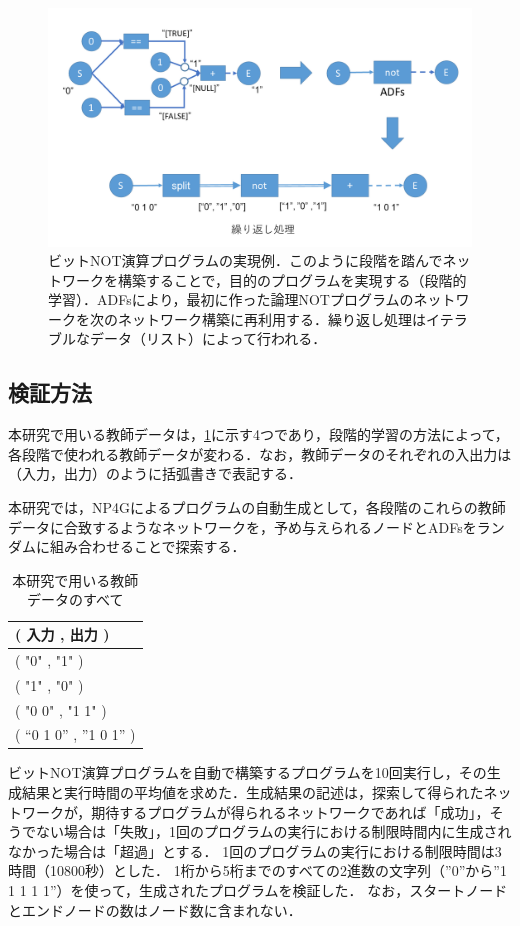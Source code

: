 \documentclass[exploratorypaper]{jsaiart} %
\begin{document}
\begin{figure}[t]
    \begin{center}
        \includegraphics[width=150mm]{bitwise_not.png}
    \end{center}
    \capwidth=130mm %
    \caption{ビットNOT演算プログラムの実現例．このように段階を踏んでネットワークを構築することで，目的のプログラムを実現する（段階的学習）．ADFsにより，最初に作った論理NOTプログラムのネットワークを次のネットワーク構築に再利用する．繰り返し処理はイテラブルなデータ（リスト）によって行われる．}
    \label{fig:bitwise_not}
\end{figure}

\subsection{検証方法}
本研究で用いる教師データは，\ref{tbl:TeacherData}に示す4つであり，段階的学習の方法によって，各段階で使われる教師データが変わる．なお，教師データのそれぞれの入出力は（入力，出力）のように括弧書きで表記する．


本研究では，NP4Gによるプログラムの自動生成として，各段階のこれらの教師データに合致するようなネットワークを，予め与えられるノードとADFsをランダムに組み合わせることで探索する．

\begin{table}[htbp]
\centering
\caption{本研究で用いる教師データのすべて}
\label{tbl:TeacherData}
\begin{tabular}{l}
    \hline
     ( 入力 , 出力 ) \\
    \hline \hline
    ( "0" , "1" ) \\
    ( "1" , "0" ) \\
    ( "0 0" , "1 1" ) \\
    ( “0 1 0” , ”1 0 1” ) \\
    \hline
\end{tabular}
\end{table}
ビットNOT演算プログラムを自動で構築するプログラムを10回実行し，その生成結果と実行時間の平均値を求めた．生成結果の記述は，探索して得られたネットワークが，期待するプログラムが得られるネットワークであれば「成功」，そうでない場合は「失敗」，1回のプログラムの実行における制限時間内に生成されなかった場合は「超過」とする．
1回のプログラムの実行における制限時間は3時間（10800秒）とした．
1桁から5桁までのすべての2進数の文字列（”0”から”1 1 1 1 1”）を使って，生成されたプログラムを検証した．
なお，スタートノードとエンドノードの数はノード数に含まれない．
\end{document}
